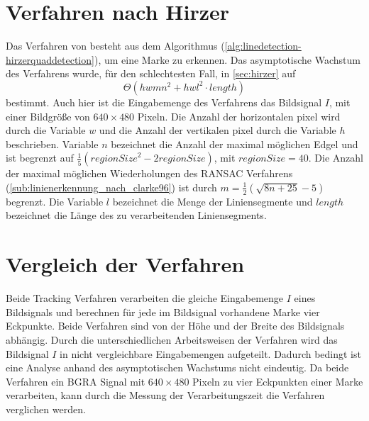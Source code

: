 \section{Verfahren nach Hirzer} %
\label{sec:section_name}
Das Verfahren von \citeauthor{hirzer08} besteht aus dem Algorithmus 
 (\autoref{alg:linedetection-hirzerquaddetection}), um eine Marke zu erkennen. Das asymptotische Wachstum des
 Verfahrens wurde, für den schlechtesten Fall, in \autoref{sec:hirzer} auf
\begin{equation*}
\Theta(hwmn^2+hwl^2\cdot\mathit{length})
\end{equation*}
bestimmt. Auch hier ist die Eingabemenge des Verfahrens das Bildsignal $I$, mit einer Bildgröße von $640 \times 480$
 Pixeln. Die Anzahl der horizontalen \gls{pixel} wird durch die Variable $w$ und die Anzahl der vertikalen
 \gls{pixel} durch die Variable $h$ beschrieben. Variable $n$ bezeichnet die Anzahl der maximal möglichen Edgel und ist
 begrenzt auf $\tfrac{1}{5}(\mathit{regionSize}^2 - 2\mathit{regionSize})$, mit $\mathit{regionSize} = 40$. Die Anzahl
 der maximal möglichen Wiederholungen des RANSAC Verfahrens (\autoref{sub:linienerkennung_nach_clarke96}) ist durch
 $m = \tfrac{1}{2}(\sqrt{8n + 25} - 5)$ begrenzt. Die Variable $l$ bezeichnet die Menge der Liniensegmente und
 $\mathit{length}$ bezeichnet die Länge des zu verarbeitenden Liniensegments.

\section{Vergleich der Verfahren} %
\label{sec:vergleich_der_verfahren}
Beide Tracking Verfahren verarbeiten die gleiche Eingabemenge $I$ eines Bildsignals und berechnen für jede im
 Bildsignal vorhandene Marke vier Eckpunkte. Beide Verfahren sind von der Höhe und der Breite des Bildsignals abhängig.
 Durch die unterschiedlichen Arbeitsweisen der Verfahren wird das Bildsignal $I$ in nicht vergleichbare Eingabemengen
 aufgeteilt. Dadurch bedingt ist eine Analyse anhand des asymptotischen Wachstums nicht eindeutig. Da beide Verfahren
 ein BGRA Signal mit $640 \times 480$ Pixeln zu vier Eckpunkten einer Marke verarbeiten, kann durch die Messung
 der Verarbeitungszeit die Verfahren verglichen werden.

